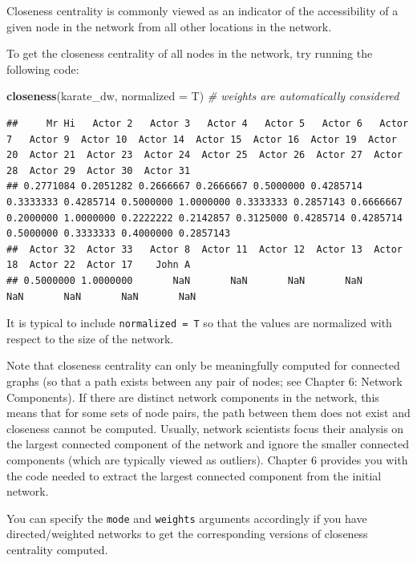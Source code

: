 \documentclass[
]{book}
\newenvironment{Shaded}{\begin{snugshade}}{\end{snugshade}}
\newcommand{\AttributeTok}[1]{\textcolor[rgb]{0.13,0.29,0.53}{#1}}
\newcommand{\CommentTok}[1]{\textcolor[rgb]{0.56,0.35,0.01}{\textit{#1}}}
\newcommand{\FunctionTok}[1]{\textcolor[rgb]{0.13,0.29,0.53}{\textbf{#1}}}
\newcommand{\NormalTok}[1]{#1}
\begin{document}
Closeness centrality is commonly viewed as an indicator of the accessibility of a given node in the network from all other locations in the network.

To get the closeness centrality of all nodes in the network, try running the following code:

\begin{Shaded}
\begin{Highlighting}[]
\FunctionTok{closeness}\NormalTok{(karate\_dw, }\AttributeTok{normalized =}\NormalTok{ T) }\CommentTok{\# weights are automatically considered}
\end{Highlighting}
\end{Shaded}

\begin{verbatim}
##     Mr Hi   Actor 2   Actor 3   Actor 4   Actor 5   Actor 6   Actor 7   Actor 9  Actor 10  Actor 14  Actor 15  Actor 16  Actor 19  Actor 20  Actor 21  Actor 23  Actor 24  Actor 25  Actor 26  Actor 27  Actor 28  Actor 29  Actor 30  Actor 31 
## 0.2771084 0.2051282 0.2666667 0.2666667 0.5000000 0.4285714 0.3333333 0.4285714 0.5000000 1.0000000 0.3333333 0.2857143 0.6666667 0.2000000 1.0000000 0.2222222 0.2142857 0.3125000 0.4285714 0.4285714 0.5000000 0.3333333 0.4000000 0.2857143 
##  Actor 32  Actor 33   Actor 8  Actor 11  Actor 12  Actor 13  Actor 18  Actor 22  Actor 17    John A 
## 0.5000000 1.0000000       NaN       NaN       NaN       NaN       NaN       NaN       NaN       NaN
\end{verbatim}

It is typical to include \texttt{normalized\ =\ T} so that the values are normalized with respect to the size of the network.

Note that closeness centrality can only be meaningfully computed for connected graphs (so that a path exists between any pair of nodes; see Chapter 6: Network Components). If there are distinct network components in the network, this means that for some sets of node pairs, the path between them does not exist and closeness cannot be computed. Usually, network scientists focus their analysis on the largest connected component of the network and ignore the smaller connected components (which are typically viewed as outliers). Chapter 6 provides you with the code needed to extract the largest connected component from the initial network.

You can specify the \texttt{mode} and \texttt{weights} arguments accordingly if you have directed/weighted networks to get the corresponding versions of closeness centrality computed.
\end{document}
